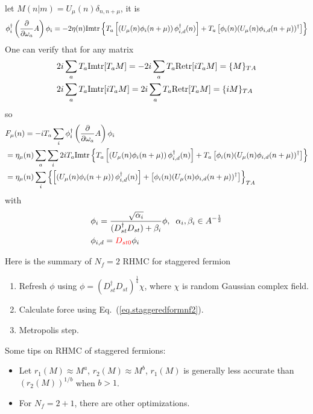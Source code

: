 let $M(n|m)=U_{\mu}(n) \delta _{n,n+\mu}$, it is
\begin{equation}
\begin{split}
&\phi _i^{\dagger}\left(\frac{\partial }{\partial \omega _a}A\right)\phi _i = -2\eta (n) {\rm Imtr}\left\{T_a  \left[\left(U_{\mu}(n)\phi _i(n+\mu)\right)\phi _{i,d}^{\dagger}(n)\right]+T_a \left[\phi _i(n)(U_{\mu}(n)\phi _{i,d}(n+\mu))^{\dagger}\right]\right\}\\
\end{split}
\end{equation}
One can verify that for any matrix \textcolor[rgb]{0,0,1}{
\begin{equation}
\begin{split}
&2i \sum _a T_a {\rm Im tr}[T_a M] = -2 i \sum _a T_a {\rm Re tr}[i T_a M] = \{M\}_{TA}\\
&2i \sum _a T_a {\rm Im tr}[i T_a M] = 2 i \sum _a T_a {\rm Re tr}[T_a M] = \{i M\}_{TA}\\
\end{split}
\end{equation}
}
so
\begin{equation}
\begin{split}
&F_{\mu}(n)=-iT_a \sum _i \phi _{i}^{\dagger} \left(\frac{\partial }{\partial \omega _a} A \right) \phi _{i}\\
&=\eta _{\mu}(n) \sum _a \sum _i 2i T_a{\rm Imtr}\left\{T_a  \left[\left(U_{\mu}(n)\phi _i(n+\mu)\right)\phi _{i,d}^{\dagger}(n)\right]+T_a \left[\phi _i(n)(U_{\mu}(n)\phi _{i,d}(n+\mu))^{\dagger}\right]\right\}\\
&=\eta _{\mu}(n) \sum _i \left\{\left[\left(U_{\mu}(n)\phi _i(n+\mu)\right)\phi _{i,d}^{\dagger}(n)\right]+\left[\phi _i(n)(U_{\mu}(n)\phi _{i,d}(n+\mu))^{\dagger}\right]\right\}_{TA}
\end{split}
\label{eq.staggeredformnf2}
\end{equation}
with
\begin{equation}
\begin{split}
&\phi _i = \frac{\sqrt{\alpha _i} }{(D_{st}^{\dagger}D_{st})+\beta _i} \phi,\;\;\alpha _i,\beta _i \in A^{-\frac{1}{2}}\\
&\phi _{i,d}=\textcolor[rgb]{1,0,0}{D_{st0}}\phi _i\\
\end{split}
\end{equation}

Here is the summary of $N_f=2$ RHMC for staggered fermion
\begin{enumerate}
  \item Refresh $\phi$ using $\phi = (D_{st}^{\dagger}D_{st})^{\frac{1}{4}}\chi$, where $\chi$ is random Gaussian complex field.
  \item Calculate force using Eq.~(\ref{eq.staggeredformnf2}).
  \item Metropolis step.
\end{enumerate}

Some tips on RHMC of staggered fermions:

\begin{itemize}
  \item Let $r_1(M)\approx M^{a}$, $r_2(M)\approx M^{b}$, $r_1(M)$ is generally less accurate than $(r_2(M))^{1/b}$ when $b>1$.
  \item For $N_f=2+1$, there are other optimizations.
\end{itemize}
